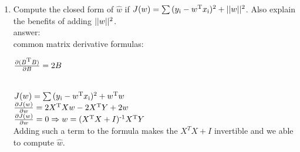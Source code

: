 \documentclass[11pt,letterpaper]{article}
\begin{document}
\begin{exercise}
\begin{enumerate}
        \item Compute the closed form of $\hat{w}$ if $J(w) = \sum{(y\textsubscript{i} - w\textsuperscript{T}x\textsubscript{i})\textsuperscript{2}} + ||w||\textsuperscript{2}$. Also explain the benefits of adding $||w||\textsuperscript{2}$.
        \\ answer:
        \\ common matrix derivative formulas:
        \\ \centerline{$\frac{\partial{(B\textsuperscript{T}B)}}{\partial{B}} = 2B$}
        \\ $J(w) = \sum{(y\textsubscript{i} - w\textsuperscript{T}x\textsubscript{i})\textsuperscript{2}} + w\textsuperscript{T}w$
        \\ $\frac{\partial{J(w)}}{\partial{w}} = 2X\textsuperscript{T}Xw - 2X\textsuperscript{T}Y + 2w$
        \\ $\frac{\partial{J(w)}}{\partial{w}} = 0 \Rightarrow w = (X\textsuperscript{T}X + I )\textsuperscript{-1}X\textsuperscript{T}Y$
        \\ 
        Adding such a term to the formula makes the $X^TX + I$ invertible and we able to compute $\hat{w}$.
        

\end{enumerate}
\end{exercise}
\end{document}
